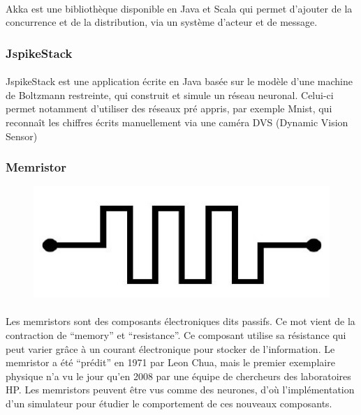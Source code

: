 \documentclass[a4paper,10pt]{article}
\begin{document}
\paragraph{}
Akka est une bibliothèque disponible en Java et Scala qui permet d’ajouter de la concurrence et de la distribution, via un système d'acteur et de message.
        
\subsubsection{JspikeStack} 

\paragraph{}
JspikeStack est une application écrite en Java basée sur le modèle d'une machine de Boltzmann restreinte, qui construit et simule un réseau neuronal. Celui-ci permet notamment d’utiliser des réseaux pré appris, par exemple Mnist, qui reconnaît les chiffres écrits manuellement via une caméra DVS (Dynamic Vision Sensor)

\subsubsection{Memristor} 
\begin{figure}[h!]
\includegraphics[scale=0.12,right]{image/memristor.jpg}
\end{figure}
\paragraph{}
Les memristors sont des composants électroniques dits passifs. Ce mot vient de la contraction de “memory” et “resistance”. Ce composant utilise sa résistance qui peut varier grâce à un courant électronique pour stocker de l’information. Le memristor a été “prédit” en 1971 par Leon Chua, mais le premier exemplaire physique n’a vu le jour qu’en 2008 par une équipe de chercheurs des laboratoires HP. Les memristors peuvent être vus comme des neurones, d’où l’implémentation d’un simulateur pour étudier le comportement de ces nouveaux composants.
\end{document}
